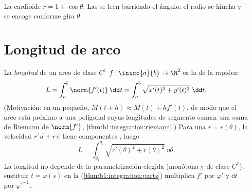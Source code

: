 \begin{omfigure}

{\small La cardioide $r = 1 + \cos\theta$. Las  se leen
barriendo el ángulo: el radio se hincha y se encoge conforme gira
$\theta$.}
\end{omfigure}

\section{Longitud de arco}

\begin{definition}\label{def:b1:curves:arclength}
La \emph{longitud} de un arco de clase $C^1$
$f \colon \intcc{a}{b} \to \R^2$ es la  de la rapidez:
\[
L = \int_a^b \norm{f'(t)}\,\dd t
= \int_a^b \sqrt{x'(t)^2 + y'(t)^2}\;\dd t .
\]
(Motivación: en un  pequeño,
$M(t + h) \approx M(t) + h f'(t)$, de modo que el arco está próximo a
una poligonal cuyas longitudes de segmento suman una suma de Riemann
de $\norm{f'}$, \cref{thm:b1:integration:riemann}.) Para una
 $r = r(\theta)$, la velocidad $r'\vec u + r\vec v$
tiene componentes , luego
\[
L = \int_{\theta_1}^{\theta_2}
\sqrt{r'(\theta)^2 + r(\theta)^2}\;\dd\theta .
\]
La longitud no depende de la parametrización elegida (monótona y de
clase $C^1$): sustituir $t = \varphi(s)$ en la 
(\cref{thm:b1:integration:parts}) multiplica $f'$ por $\varphi'$ y
$\dd t$ por $\varphi'^{-1}$.
\end{definition}

